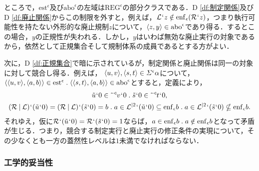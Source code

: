 ところで，$ \mathrm{est}^\epsilon $及び$ \mathrm{abo}^\epsilon $の左域は$ \mathrm{REG}^\epsilon $の部分クラスである．D \ref{df:制定関係}及びD \ref{df:廃止関係}からこの制限を外すと，例えば，$\mathcal{L}{\mspace{1mu}{`}\mspace{1mu}} z\notin \mathrm{enf}_{\epsilon}(\mathcal{R}{\mspace{1mu}{`}\mspace{1mu}} z)$，つまり執行可能性を持たない外形的な廃止規制$z$について，$\langle z,y \rangle\in\mathrm{abo}^\epsilon$であり得る．するとこの場合，$y$の正規性が失われる．しかし，$y$はいわば無効な廃止実行の対象であるから，依然として正規集合そして規制体系の成員であるとする方がよい．

次に，D \ref{df:正規集合}で暗に示されているが，制定関係と廃止関係は同一の対象に対して競合し得る．例えば，
$ \langle u,v \rangle,\langle s,t \rangle\in\varSigma^{\epsilon}\alpha $について，$ \orp{\orp{u,v},\orp{a,b}}\in\mathrm{est}^\epsilon\con{1}\orp{\orp{s,t},\orp{a,b}}\in \mathrm{abo}^\epsilon $とすると，定義により，
\begin{gather*}
    \tilde{u}\fap 0\in \tildel{\trgl{v}}\fap 0\con{1}\tilde{s}\fap 0\in \tildel{\trgl{t}}\fap 0,\\
    (\mathcal{R}\resl\mathcal{L})\fap(\tilde{u}\fap 0) = (\mathcal{R}\resl\mathcal{L})\fap(\tilde{s}\fap 0) = b \con{1}
    a\in \iter{\mathcal{L}}{2}\fap(\tilde{u}\fap 0)\subseteq \enf{\epsilon}b \con{1}
    a\in \iter{\mathcal{L}}{2}\fap(\tilde{s}\fap 0)\nsubseteq \enf{\epsilon}b.
\end{gather*}
それゆえ，仮に$ \mathcal{R}{\mspace{1mu}{`}\mspace{1mu}}(\tilde{u}{\mspace{1mu}{`}\mspace{1mu}} 0)=\mathcal{R}{\mspace{1mu}{`}\mspace{1mu}}(\tilde{s}{\mspace{1mu}{`}\mspace{1mu}} 0)= 1 $ならば，$ a\in\enf{\epsilon}b\con{1}a\notin\enf{\epsilon}b $となって矛盾が生じる．つまり，競合する制定実行と廃止実行の修正条件の実現について，その少なくとも一方の蓋然性レベルは$1$未満でなければならない．

\subsubsection{工学的妥当性}
\label{sssec:工学的妥当性}


